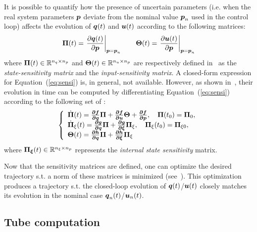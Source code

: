It is possible to quantify how the presence of uncertain parameters (i.e. when the real system parameters $\boldsymbol{p}$ deviate from the nominal value $\boldsymbol{p}_n$ used in the control loop) affects the evolution of $\boldsymbol{q}(t)$ and $\boldsymbol{u}(t)$ according to the following matrices:
\begin{equation}\label{eq:sensi}
  \boldsymbol{\Pi}(t)=\left.\frac{\partial \boldsymbol{q}(t)}{\partial \boldsymbol{p}}\right|_{\boldsymbol{p}=\boldsymbol{p}_n} \quad\quad \boldsymbol{\Theta}(t)=\left.\frac{\partial \boldsymbol{u}(t)}{\partial \boldsymbol{p}}\right|_{\boldsymbol{p}=\boldsymbol{p}_n}
\end{equation}
where $\boldsymbol{\Pi}(t)\in \mathbb{R}^{n_q \times n_p}$ and $\boldsymbol{\Theta}(t)\in \mathbb{R}^{n_u \times n_p}$ are respectively defined in~\cite{cPi,cTh} as the \emph{state-sensitivity matrix} and the \emph{input-sensitivity matrix}.
A closed-form expression for Equation~(\ref{eq:sensi}) is, in general, not available. 
However, as shown in~\cite{cPi,cTh}, their evolution in time can be computed by differentiating Equation~(\ref{eq:sensi}) according to the following set of :
\begin{equation}\label{eq:dyna_sensi}
  \left \{
  \begin{array}{l l l}
       \dot{\boldsymbol{\Pi}}(t) = \boldsymbol{\frac{\partial{f}}{\partial{q}}}\boldsymbol{\Pi}+ \boldsymbol{\frac{\partial{f}}{\partial{u}}}\boldsymbol{\Theta}+ \boldsymbol{\frac{\partial{f}}{\partial{p}}}, \quad \boldsymbol{\Pi}(t_0)=\boldsymbol{\Pi}_0, \\
       \dot{\boldsymbol{\Pi}}_{\xi}(t) = \boldsymbol{\frac{\partial{g}}{\partial{q}}}\boldsymbol{\Pi}+ \boldsymbol{\frac{\partial{g}}{\partial{\xi}}}\boldsymbol{\Pi}_{\xi}, \quad \boldsymbol{\Pi}_{\xi}(t_0)=\boldsymbol{\Pi}_{\xi0}, \\
       \boldsymbol{\Theta}(t) = \boldsymbol{\frac{\partial{h}}{\partial{q}}}\boldsymbol{\Pi}+ \boldsymbol{\frac{\partial{h}}{\partial{\xi}}}\boldsymbol{\Pi}_{\xi} 
  \end{array}
  \right .
\end{equation}
where $\boldsymbol{\Pi_{\xi}}(t)\in \mathbb{R}^{n_{\xi} \times n_p}$ represents the \emph{internal state sensitivity} matrix.

Now that the sensitivity matrices are defined, one can optimize the desired trajectory s.t. a norm of these matrices is minimized (see~\cite{cPi,cTh}). 
This optimization produces a trajectory s.t. the closed-loop evolution of $\boldsymbol{q}(t)$/$\boldsymbol{u}(t)$ closely matches its evolution in the nominal case $\boldsymbol{q}_n(t)$/$\boldsymbol{u}_n(t)$.

\subsection{Tube computation}\label{sec:tubes}

